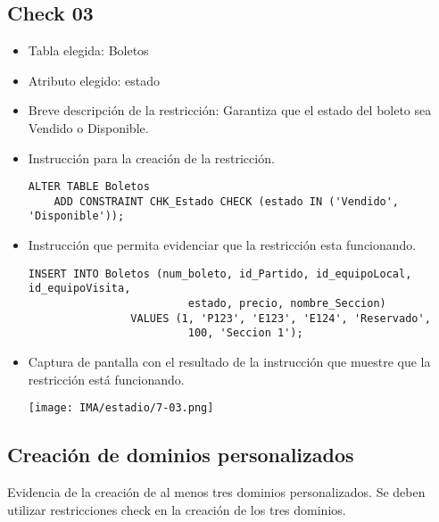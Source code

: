 \subsection*{Check 03}
\begin{itemize}
    \item Tabla elegida: Boletos
    \item Atributo elegido: estado
    \item Breve descripción de la restricción: Garantiza que el estado del boleto sea Vendido o Disponible.
    \item Instrucción para la creación de la restricción.
    \begin{lstlisting}[caption={Tablas para la BdDatos}, label={lst:sql_estadios}]
    ALTER TABLE Boletos
    ADD CONSTRAINT CHK_Estado CHECK (estado IN ('Vendido', 'Disponible'));        
    \end{lstlisting}
    \item Instrucción que permita evidenciar que la restricción esta funcionando.
    \begin{lstlisting}[caption={Tablas para la BdDatos}, label={lst:sql_estadios}]
    INSERT INTO Boletos (num_boleto, id_Partido, id_equipoLocal, id_equipoVisita,
                         estado, precio, nombre_Seccion) 
                VALUES (1, 'P123', 'E123', 'E124', 'Reservado',
                         100, 'Seccion 1');    
    \end{lstlisting}

    \item Captura de pantalla con el resultado de la instrucción que muestre que la restricción está
    funcionando.
    \begin{center}
        \texttt{[image: IMA/estadio/7-03.png]}
    \end{center}
\end{itemize}



\subsection{Creación de dominios personalizados}

Evidencia de la creación de al menos tres dominios personalizados. Se deben utilizar restricciones check en la creación de los tres dominios.

